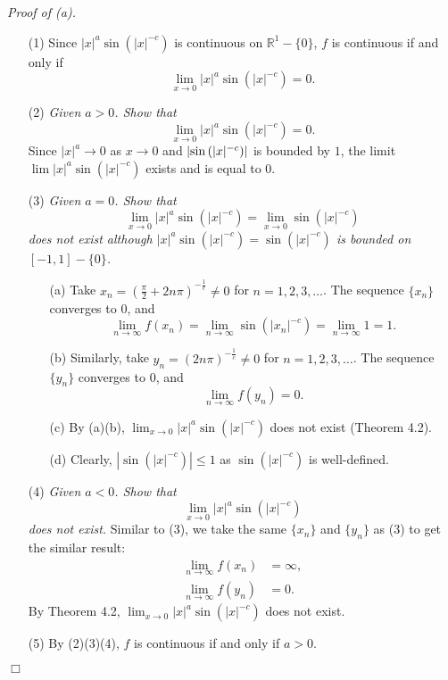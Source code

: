 \documentclass{article}
\begin{document}
\emph{Proof of (a).}
\begin{enumerate}
  \item[(1)]
  Since $|x|^a \sin{(|x|^{-c})}$ is continuous on $\mathbb{R}^1 - \{0\}$,
  $f$ is continuous if and only if
  \[
    \lim_{x \to 0} |x|^a \sin{(|x|^{-c})} = 0.
  \]

  \item[(2)]
  \emph{Given $a > 0$.
  Show that}
  \[
    \lim_{x \to 0} |x|^a \sin{(|x|^{-c})} = 0.
  \]
  Since $|x|^a \to 0$ as $x \to 0$ and $\abs{ \sin{(|x|^{-c})} }$ is bounded by $1$,
  the limit $\lim |x|^a \sin{(|x|^{-c})}$ exists and is equal to $0$.

  \item[(3)]
  \emph{Given $a = 0$.
  Show that
  \[
    \lim_{x \to 0} |x|^a \sin{(|x|^{-c})} = \lim_{x \to 0} \sin{(|x|^{-c})}
  \]
  does not exist although
  $|x|^a \sin{(|x|^{-c})} = \sin{(|x|^{-c})}$ is bounded on $[-1,1] - \{0\}$.}
  \begin{enumerate}
    \item[(a)]
    Take $x_n = \left( \frac{\pi}{2} + 2n\pi \right)^{-\frac{1}{c}} \neq 0$
    for $n = 1, 2, 3, \ldots$.
    The sequence $\{ x_n \}$ converges to $0$, and
    \[
      \lim_{n \to \infty} f(x_n)
      = \lim_{n \to \infty} \sin{(|x_n|^{-c})}
      = \lim_{n \to \infty} 1
      = 1.
    \]

    \item[(b)]
    Similarly, take $y_n = \left( 2n\pi \right)^{-\frac{1}{c}} \neq 0$
    for $n = 1, 2, 3, \ldots$.
    The sequence $\{ y_n \}$ converges to $0$, and
    \[
      \lim_{n \to \infty} f(y_n) = 0.
    \]

    \item[(c)]
    By (a)(b), $\lim_{x \to 0} |x|^a \sin{(|x|^{-c})}$ does not exist (Theorem 4.2).

    \item[(d)]
    Clearly, $|\sin{(|x|^{-c})}| \leq 1$ as $\sin{(|x|^{-c})}$ is well-defined.
  \end{enumerate}

  \item[(4)]
  \emph{Given $a < 0$.
  Show that
  \[
    \lim_{x \to 0} |x|^a \sin{(|x|^{-c})}
  \]
  does not exist.}
  Similar to (3), we take the same $\{x_n\}$ and $\{y_n\}$ as (3)
  to get the similar result:
  \begin{align*}
    \lim_{n \to \infty} f(x_n) &= \infty, \\
    \lim_{n \to \infty} f(y_n) &= 0.
  \end{align*}
  By Theorem 4.2, $\lim_{x \to 0} |x|^a \sin{(|x|^{-c})}$ does not exist.

  \item[(5)]
  By (2)(3)(4), $f$ is continuous if and only if $a > 0$.
\end{enumerate}
$\Box$ \\
\end{document}
